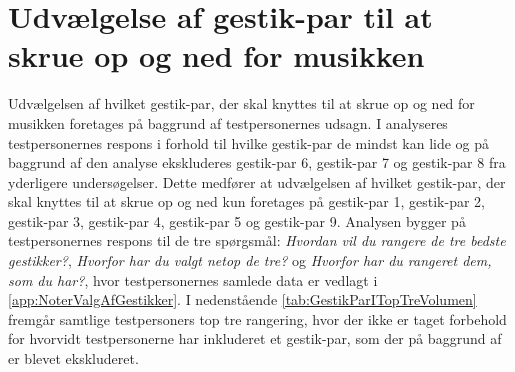 \section{Udvælgelse af gestik-par til at skrue op og ned for musikken}
\label{TestresultaterVolumen}
%
Udvælgelsen af hvilket gestik-par, der skal knyttes til at skrue op og ned for musikken foretages på baggrund af testpersonernes udsagn. I  analyseres testpersonernes respons i forhold til hvilke gestik-par de mindst kan lide og på baggrund af den analyse ekskluderes gestik-par 6, gestik-par 7 og gestik-par 8 fra yderligere undersøgelser. Dette medfører at udvælgelsen af hvilket gestik-par, der skal knyttes til at skrue op og ned kun foretages på gestik-par 1, gestik-par 2, gestik-par 3, gestik-par 4, gestik-par 5 og gestik-par 9. Analysen bygger på testpersonernes respons til de tre spørgsmål: \textit{Hvordan vil du rangere de tre bedste gestikker?}, \textit{Hvorfor har du valgt netop de tre?} og \textit{Hvorfor har du rangeret dem, som du har?}, hvor testpersonernes samlede data er vedlagt i \autoref{app:NoterValgAfGestikker}. \blankline
%  
I nedenstående \autoref{tab:GestikParITopTreVolumen} fremgår samtlige testpersoners top tre rangering, hvor der ikke er taget forbehold for hvorvidt testpersonerne har inkluderet et gestik-par, som der på baggrund af  er blevet ekskluderet.
%
